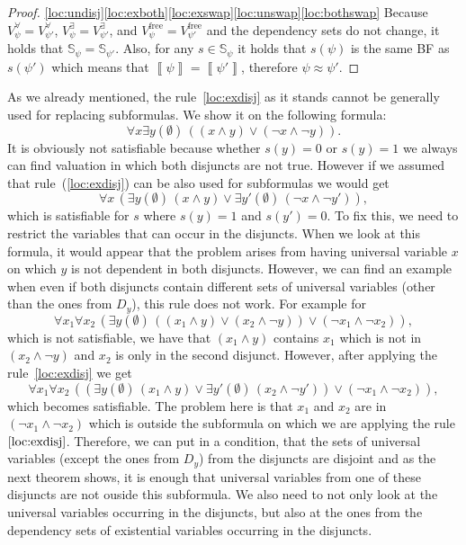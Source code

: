 \documentclass[
  digital, %
  twoside, %
  table,   %
  nolof,     %
  nolot,     %
]{fithesis3}
\theoremstyle{definition}
\theoremstyle{remark}
\newcommand{\seman}[1]{\left\llbracket {#1} \right\rrbracket}
\newcommand{\evars}[1]{V_{#1}^{\exists}}
\newcommand{\uvars}[1]{V_{#1}^{\forall}}
\newcommand{\fvars}[1]{V_{#1}^{\mathrm{free}}}
\newcommand{\Scands}[1]{\mathbb{S}_{#1}}
\newcommand{\itholds}{\,}
\begin{document}
\begin{proof}
  \eqref{loc:undisj}\eqref{loc:exboth}\eqref{loc:exswap}\eqref{loc:unswap}\eqref{loc:bothswap} Because $\uvars{\psi} = \uvars{\psi'}$, $\evars{\psi} = \evars{\psi'}$, and $\fvars{\psi} = \fvars{\psi'}$ and the dependency sets do not change, it holds that $\Scands{\psi} = \Scands{\psi'}$. Also, for any $s \in \Scands{\psi}$ it holds that $s(\psi)$ is the same BF as $s(\psi')$ which means that $\seman{\psi} = \seman{\psi'}$, therefore $\psi \approx \psi'$.
\end{proof}

As we already mentioned, the rule~\eqref{loc:exdisj} as it stands cannot be generally used for replacing subformulas. We show it on the following formula:
\[\forall x \exists y(\emptyset) \itholds ((x \land y) \lor (\neg x \land \neg y)).\]
It is obviously not satisfiable because whether $s(y) = 0$ or $s(y) = 1$ we always can find valuation in which both disjuncts are not true. However if we assumed that rule~(\ref{loc:exdisj}) can be also used for subformulas we would get
\[\forall x \itholds (\exists y(\emptyset) \itholds (x \land y) \lor \exists y'(\emptyset) \itholds (\neg x \land \neg y')),\]
which is satisfiable for $s$ where $s(y) = 1$ and $s(y') = 0$. To fix this, we need to restrict the variables that can occur in the disjuncts. When we look at this formula, it would appear that the problem arises from having universal variable $x$ on which $y$ is not dependent in both disjuncts. However, we can find an example when even if both disjuncts contain different sets of universal variables (other than the ones from $D_y$), this rule does not work. For example for
\[\forall x_1 \forall x_2 \itholds (\exists y(\emptyset) \itholds ((x_1 \land y) \lor (x_2 \land \neg y)) \lor (\neg x_1 \land \neg x_2)),\]
which is not satisfiable, we have that $(x_1 \land y)$ contains $x_1$ which is not in $(x_2 \land \neg y)$ and $x_2$ is only in the second disjunct. However, after applying the rule~\eqref{loc:exdisj} we get
\[\forall x_1 \forall x_2 \itholds ((\exists y(\emptyset) \itholds (x_1 \land y) \lor \exists y'(\emptyset) \itholds (x_2 \land \neg y')) \lor (\neg x_1 \land \neg x_2)),\]
which becomes satisfiable. The problem here is that $x_1$ and $x_2$ are in $(\neg x_1 \land \neg x_2)$ which is outside the subformula on which we are applying the rule $\eqref{loc:exdisj}$. Therefore, we can put in a condition, that the sets of universal variables (except the ones from $D_y$) from the disjuncts are disjoint and as the next theorem shows, it is enough that universal variables from one of these disjuncts are not ouside this subformula. We also need to not only look at the universal variables occurring in the disjuncts, but also at the ones from the dependency sets of existential variables occurring in the disjuncts.
\end{document}
